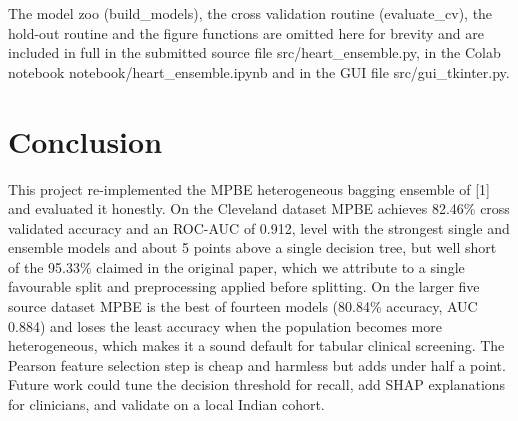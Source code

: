 \documentclass[12pt,a4paper,oneside]{report}
\begin{document}
The model zoo (build\_models), the cross validation routine (evaluate\_cv), the hold-out routine and the figure functions are omitted here for brevity and are included in full in the submitted source file src/heart\_ensemble.py, in the Colab notebook notebook/heart\_ensemble.ipynb and in the GUI file src/gui\_tkinter.py.

\chapter{Conclusion}
This project re-implemented the MPBE heterogeneous bagging ensemble of [1] and evaluated it honestly. On the Cleveland dataset MPBE achieves 82.46\% cross validated accuracy and an ROC-AUC of 0.912, level with the strongest single and ensemble models and about 5 points above a single decision tree, but well short of the 95.33\% claimed in the original paper, which we attribute to a single favourable split and preprocessing applied before splitting. On the larger five source dataset MPBE is the best of fourteen models (80.84\% accuracy, AUC 0.884) and loses the least accuracy when the population becomes more heterogeneous, which makes it a sound default for tabular clinical screening. The Pearson feature selection step is cheap and harmless but adds under half a point. Future work could tune the decision threshold for recall, add SHAP explanations for clinicians, and validate on a local Indian cohort.
\end{document}
